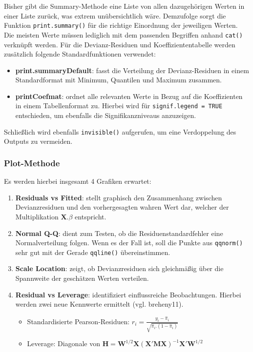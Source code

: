 \documentclass[12pt,]{article}
\providecommand{\tightlist}{%
  \setlength{\itemsep}{0pt}\setlength{\parskip}{0pt}}
\begin{document}
Bisher gibt die Summary-Methode eine Liste von allen dazugehörigen
Werten in einer Liste zurück, was extrem unübersichtlich wäre.
Demzufolge sorgt die Funktion \texttt{print.summary()} für die richtige
Einordnung der jeweiligen Werten. Die meisten Werte müssen lediglich mit
dem passenden Begriffen anhand \texttt{cat()} verknüpft werden. Für die
Devianz-Residuen und Koeffiziententabelle werden zusätzlich folgende
Standardfunktionen verwendet:

\begin{itemize}
\tightlist
\item
  \textbf{print.summaryDefault}: fasst die Verteilung der
  Devianz-Residuen in einem Standardformat mit Minimum, Quantilen und
  Maximum zusammen.
\item
  \textbf{printCoefmat}: ordnet alle relevanten Werte in Bezug auf die
  Koeffizienten in einem Tabellenformat zu. Hierbei wird für
  \texttt{signif.legend\ =\ TRUE} entschieden, um ebenfalls die
  Signifikanzniveaus anzuzeigen.
\end{itemize}

Schließlich wird ebenfalls \texttt{invisible()} aufgerufen, um eine
Verdoppelung des Outputs zu vermeiden.

\subsubsection{Plot-Methode}\label{plot-methode}

Es werden hierbei insgesamt 4 Grafiken erwartet:

\begin{enumerate}
\def\labelenumi{\arabic{enumi}.}
\tightlist
\item
  \textbf{Residuals vs Fitted}: stellt graphisch den Zusammenhang
  zwischen Devianzresiduen und den vorhergesagten wahren Wert dar,
  welcher der Multiplikation \(\mathbf{X}.\beta\) entspricht.
\item
  \textbf{Normal Q-Q}: dient zum Testen, ob die Residuenstandardfehler
  eine Normalverteilung folgen. Wenn es der Fall ist, soll die Punkte
  aus \texttt{qqnorm()} sehr gut mit der Gerade \texttt{qqline()}
  übereinstimmen.
\item
  \textbf{Scale Location}: zeigt, ob Devianzresiduen sich gleichmäßig
  über die Spannweite der geschätzen Werten verteilen.
\item
  \textbf{Residual vs Leverage}: identifiziert einflussreiche
  Beobachtungen. Hierbei werden zwei neue Kennwerte ermittelt (vgl.
  breheny11).

  \begin{itemize}
  \item
    Standardisierte Pearson-Residuen:
    \(r_i = \frac{y_i-\hat{\pi}_i}{\sqrt{\hat{\pi}_i.(1-\hat{\pi}_i)}}\)
  \item
    Leverage: Diagonale von
    \(\mathbf{H} = \mathbf{W}^{1/2} \mathbf{X}(\mathbf{X'}\mathbf{M}\mathbf{X})^{{-1}}\mathbf{X'}\mathbf{W}^{1/2}\)
  \end{itemize}
\end{enumerate}
\end{document}
